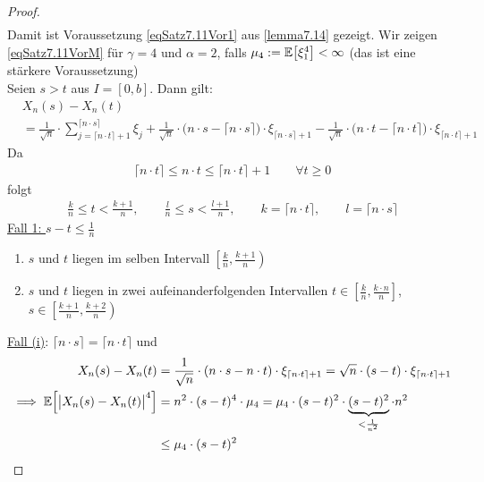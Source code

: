 \begin{proof}
\begin{align*}
\end{align*}
Damit ist Voraussetzung \eqref{eqSatz7.11Vor1} aus \ref{lemma7.14} gezeigt.\nl
Wir zeigen \eqref{eqSatz7.11VorM} für $\gamma=4$ und $\alpha=2$, falls $\mu_4:=\mathbb{E}\big[\xi_1^4\big]<\infty$ (das ist eine stärkere Voraussetzung)\\
Seien $s>t$ aus $I=[0,b]$. Dann gilt:
\begin{align}\label{eqProof7.16Plus}\tag{+}
&X_n(s)-X_n(t)\\
&=\frac{1}{\sqrt{n}}\cdot\sum\limits_{j=\lceil n\cdot t\rceil+1}^{\lceil n\cdot s\rceil}\xi_j+\frac{1}{\sqrt{n}}\cdot\big(n\cdot s-\lceil n\cdot s\rceil\big)\cdot\xi_{\lceil n\cdot s\rceil+1}
-\frac{1}{\sqrt{n}}\cdot\big(n\cdot t-\lceil n\cdot t\rceil\big)\cdot\xi_{\lceil n\cdot t\rceil+1}\nonumber
\end{align}
Da 
\begin{align}\label{eqProof7.16PlusPlus}\tag{++}
\lceil n\cdot t\rceil\leq n\cdot t\leq\lceil n\cdot t\rceil+1\qquad\forall t\geq0
\end{align}
folgt
\begin{align*}
\frac{k}{n}\leq t<\frac{k+1}{n},\qquad\frac{l}{n}\leq s<\frac{l+1}{n},\qquad k=\lceil n\cdot t\rceil,\qquad l=\lceil n\cdot s\rceil
\end{align*}
\underline{Fall 1: $s-t\leq\frac{1}{n}$}
\begin{enumerate}[label=(\roman*)]
\item $s$ und $t$ liegen im selben Intervall $\left[\frac{k}{n},\frac{k+1}{n}\right)$
\item $s$ und $t$ liegen in zwei aufeinanderfolgenden Intervallen $t\in\left[\frac{k}{n},\frac{k\cdot n}{n}\right]$, $s\in\left[\frac{k+1}{n},\frac{k+2}{n}\right)$
\end{enumerate}
\ul{Fall (i)}: $\lceil n\cdot s\rceil=\lceil n\cdot t\rceil$ und
\begin{align*}
X_n(s)-X_n(t)
&=\frac{1}{\sqrt{n}}\cdot(n\cdot s-n\cdot t)\cdot\xi_{\lceil n\cdot t\rceil+1}
=\sqrt{n}\cdot(s-t)\cdot\xi_{\lceil n\cdot t\rceil+1}\\
\implies
\mathbb{E}\Big[\big|X_n(s)-X_n(t)\big|^4\Big]
&=n^2\cdot(s-t)^4\cdot\mu_4
=\mu_4\cdot(s-t)^2\cdot\underbrace{(s-t)^2}_{<\frac{1}{n^2}}\cdot n^2\\
&\leq\mu_4\cdot(s-t)^2
\end{align*}

\end{proof}

